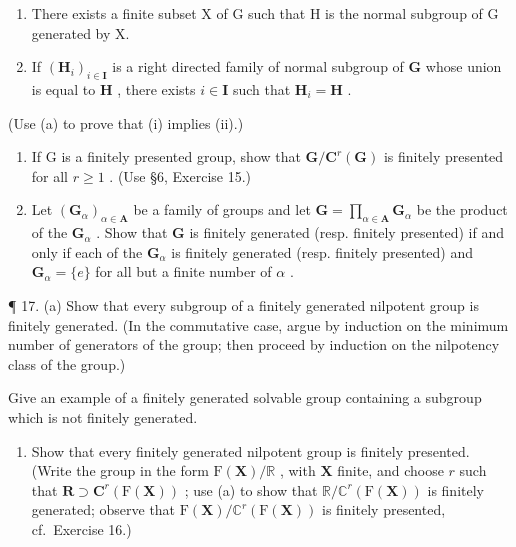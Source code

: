 \begin{enumerate}
\def\labelenumi{(\roman{enumi})}
\setcounter{enumi}{1}
\item
  There exists a finite subset X of G such that H is the normal subgroup of G generated by X.
\item
  If \((\mathbf{H}_i)_{i\in \mathbf{I}}\) is a right directed family of normal subgroup of \(\mathbf{G}\) whose union is equal to \(\mathbf{H}\) , there exists \(i\in \mathbf{I}\) such that \(\mathbf{H}_i = \mathbf{H}\) .
\end{enumerate}

(Use (a) to prove that (i) implies (ii).)

\begin{enumerate}
\def\labelenumi{(\alph{enumi})}
\setcounter{enumi}{4}
\item
  If G is a finitely presented group, show that \(\mathbf{G}/\mathbf{C}^{r}(\mathbf{G})\) is finitely presented for all \(r \geqslant 1\) . (Use §6, Exercise 15.)
\item
  Let \((\mathbf{G}_{\alpha})_{\alpha \in \mathbf{A}}\) be a family of groups and let \(\mathbf{G} = \prod_{\alpha \in \mathbf{A}} \mathbf{G}_{\alpha}\) be the product of the \(\mathbf{G}_{\alpha}\) . Show that \(\mathbf{G}\) is finitely generated (resp. finitely presented) if and only if each of the \(\mathbf{G}_{\alpha}\) is finitely generated (resp. finitely presented) and \(\mathbf{G}_{\alpha} = \{e\}\) for all but a finite number of \(\alpha\) .
\end{enumerate}

¶ 17. (a) Show that every subgroup of a finitely generated nilpotent group is finitely generated. (In the commutative case, argue by induction on the minimum number of generators of the group; then proceed by induction on the nilpotency class of the group.)

Give an example of a finitely generated solvable group containing a subgroup which is not finitely generated.

\begin{enumerate}
\def\labelenumi{(\alph{enumi})}
\setcounter{enumi}{1}
\tightlist
\item
  Show that every finitely generated nilpotent group is finitely presented. (Write the group in the form \(\mathrm{F}(\mathbf{X}) / \mathbb{R}\) , with \(\mathbf{X}\) finite, and choose \(r\) such that \(\mathbf{R} \supset \mathbf{C}^r (\mathrm{F}(\mathbf{X}))\) ; use (a) to show that \(\mathbb{R} / \mathbb{C}^r (\mathrm{F}(\mathbf{X}))\) is finitely generated; observe that \(\mathrm{F}(\mathbf{X}) / \mathbb{C}^r (\mathrm{F}(\mathbf{X}))\) is finitely presented, cf.~Exercise 16.)
\end{enumerate}

